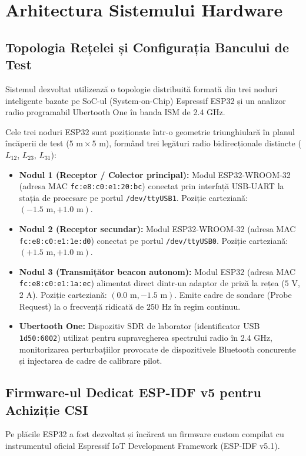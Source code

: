 \chapter{Arhitectura Sistemului Hardware}
\label{chap:arhitectura_hardware}

\section{Topologia Rețelei și Configurația Bancului de Test}
Sistemul dezvoltat utilizează o topologie distribuită formată din trei noduri inteligente bazate pe SoC-ul (System-on-Chip) Espressif ESP32 și un analizor radio programabil Ubertooth One în banda ISM de 2.4 GHz.

Cele trei noduri ESP32 sunt poziționate într-o geometrie triunghiulară în planul încăperii de test ($5\text{ m} \times 5\text{ m}$), formând trei legături radio bidirecționale distincte ($L_{12}$, $L_{23}$, $L_{31}$):
\begin{itemize}
    \item \textbf{Nodul 1 (Receptor / Colector principal):} Modul ESP32-WROOM-32 (adresa MAC \texttt{fc:e8:c0:e1:20:bc}) conectat prin interfață USB-UART la stația de procesare pe portul \texttt{/dev/ttyUSB1}. Poziție carteziană: $(-1.5\text{ m}, +1.0\text{ m})$.
    \item \textbf{Nodul 2 (Receptor secundar):} Modul ESP32-WROOM-32 (adresa MAC \texttt{fc:e8:c0:e1:1e:d0}) conectat pe portul \texttt{/dev/ttyUSB0}. Poziție carteziană: $(+1.5\text{ m}, +1.0\text{ m})$.
    \item \textbf{Nodul 3 (Transmițător beacon autonom):} Modul ESP32 (adresa MAC \texttt{fc:e8:c0:e1:1a:ec}) alimentat direct dintr-un adaptor de priză la rețea ($5\text{ V}$, $2\text{ A}$). Poziție carteziană: $(0.0\text{ m}, -1.5\text{ m})$. Emite cadre de sondare (Probe Request) la o frecvență ridicată de $250\text{ Hz}$ în regim continuu.
    \item \textbf{Ubertooth One:} Dispozitiv SDR de laborator (identificator USB \texttt{1d50:6002}) utilizat pentru supravegherea spectrului radio în 2.4 GHz, monitorizarea perturbațiilor provocate de dispozitivele Bluetooth concurente și injectarea de cadre de calibrare pilot.
\end{itemize}

\section{Firmware-ul Dedicat ESP-IDF v5 pentru Achiziție CSI}
Pe plăcile ESP32 a fost dezvoltat și încărcat un firmware custom compilat cu instrumentul oficial Espressif IoT Development Framework (ESP-IDF v5.1).

